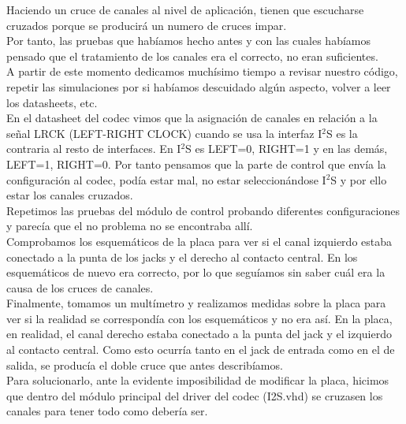 Haciendo un cruce de canales al nivel de aplicación, tienen que escucharse cruzados porque se producirá un numero de cruces impar.\\

Por tanto, las pruebas que habíamos hecho antes y con las cuales habíamos pensado que el tratamiento de los canales era el correcto, no eran suficientes.\\

A partir de este momento dedicamos muchísimo tiempo a revisar nuestro código, repetir las simulaciones por si habíamos descuidado algún aspecto, volver a leer los datasheets, etc.\\

En el datasheet del codec vimos que la asignación de canales en relación a la señal LRCK (LEFT-RIGHT CLOCK) cuando se usa la interfaz I$^2$S es la contraria al resto de interfaces. En I$^2$S es LEFT=0, RIGHT=1 y en las demás, LEFT=1, RIGHT=0. Por tanto pensamos que la parte de control que envía la configuración al codec, podía estar mal, no estar seleccionándose I$^2$S y por ello estar los canales cruzados.\\

Repetimos las pruebas del módulo de control probando diferentes configuraciones y parecía que el no problema no se encontraba allí.\\

Comprobamos los esquemáticos de la placa para ver si el canal izquierdo estaba conectado a la punta de los jacks y  el derecho al contacto central. En los esquemáticos de nuevo era correcto, por lo que seguíamos sin saber cuál era la causa de los cruces de canales.\\

Finalmente, tomamos un multímetro y realizamos medidas sobre la placa para ver si la realidad se correspondía con los esquemáticos y no era así. En la placa, en realidad, el canal derecho estaba conectado a la punta del jack y el izquierdo al contacto central. Como esto ocurría tanto en el jack de entrada como en el de salida, se producía el doble cruce que antes describíamos.\\

Para solucionarlo, ante la evidente imposibilidad de modificar la placa, hicimos que dentro del módulo principal del driver del codec (I2S.vhd) se cruzasen los canales para tener todo como debería ser.
		
	

	
